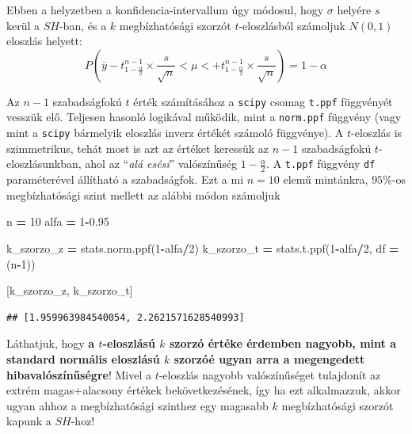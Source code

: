 \documentclass[
]{book}
\newenvironment{Shaded}{\begin{snugshade}}{\end{snugshade}}
\newcommand{\DecValTok}[1]{\textcolor[rgb]{0.00,0.00,0.81}{#1}}
\newcommand{\FloatTok}[1]{\textcolor[rgb]{0.00,0.00,0.81}{#1}}
\newcommand{\NormalTok}[1]{#1}
\newcommand{\OperatorTok}[1]{\textcolor[rgb]{0.81,0.36,0.00}{\textbf{#1}}}
\begin{document}
Ebben a helyzetben a konfidencia-intervallum úgy módosul, hogy \(\sigma\) helyére \(s\) kerül a \(SH\)-ban, és a \(k\) megbízhatósági szorzót \(t\)-eloszlásból számoljuk \(N(0,1)\) eloszlás helyett: \[P\left(\bar{y}-t_{1-\frac{\alpha}{2}}^{n-1} \times \frac{s}{\sqrt{n}}< \mu <+t_{1-\frac{\alpha}{2}}^{n-1} \times \frac{s}{\sqrt{n}}\right) = 1- \alpha\]

Az \(n-1\) szabadságfokú \(t\) érték számításához a \texttt{scipy} csomag \texttt{t.ppf} függvényét vesszük elő. Teljesen hasonló logikával működik, mint a \texttt{norm.ppf} függvény (vagy mint a \texttt{scipy} bármelyik eloszlás inverz értékét számoló függvénye). A \(t\)-eloszlás is szimmetrikus, tehát most is azt az értéket keressük az \(n-1\) szabadságfokú \(t\)-eloszlásunkban, ahol az ``\emph{alá esési}'' valószínűség \(1-\frac{\alpha}{2}\). A \texttt{t.ppf} függvény \texttt{df} paraméterével állítható a szabadságfok.
Ezt a mi \(n=10\) elemű mintánkra, \(95\%\)-os megbízhatósági szint mellett az alábbi módon számoljuk

\begin{Shaded}
\begin{Highlighting}[]
\NormalTok{n }\OperatorTok{=} \DecValTok{10}
\NormalTok{alfa }\OperatorTok{=} \DecValTok{1}\OperatorTok{{-}}\FloatTok{0.95}

\NormalTok{k\_szorzo\_z }\OperatorTok{=}\NormalTok{ stats.norm.ppf(}\DecValTok{1}\OperatorTok{{-}}\NormalTok{alfa}\OperatorTok{/}\DecValTok{2}\NormalTok{)}
\NormalTok{k\_szorzo\_t }\OperatorTok{=}\NormalTok{ stats.t.ppf(}\DecValTok{1}\OperatorTok{{-}}\NormalTok{alfa}\OperatorTok{/}\DecValTok{2}\NormalTok{, df }\OperatorTok{=}\NormalTok{ (n}\OperatorTok{{-}}\DecValTok{1}\NormalTok{))}

\NormalTok{[k\_szorzo\_z, k\_szorzo\_t]}
\end{Highlighting}
\end{Shaded}

\begin{verbatim}
## [1.959963984540054, 2.2621571628540993]
\end{verbatim}

Láthatjuk, hogy \textbf{a \(t\)-eloszlású \(k\) szorzó értéke érdemben nagyobb, mint a standard normális eloszlású \(k\) szorzóé ugyan arra a megengedett hibavalószínűségre}! Mivel a \(t\)-eloszlás nagyobb valószínűséget tulajdonít az extrém magas+alacsony értékek bekövetkezésének, így ha ezt alkalmazzuk, akkor ugyan ahhoz a megbízhatósági szinthez egy magasabb \(k\) megbízhatósági szorzót kapunk a \(SH\)-hoz!
\end{document}
